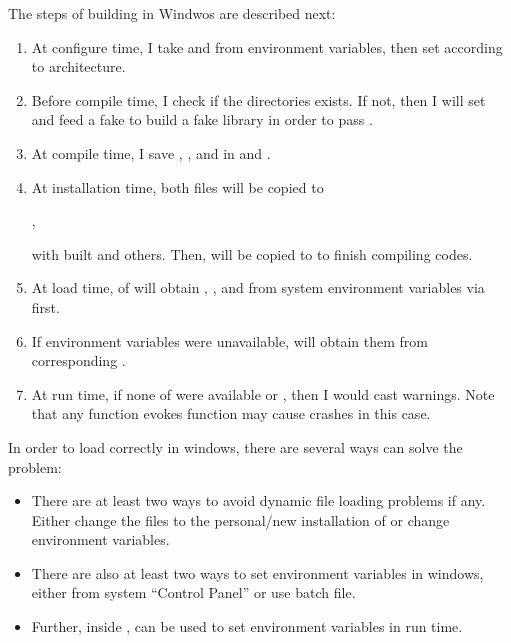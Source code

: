 The steps of building  in Windwos are described next:
\begin{enumerate}
\item
At configure time, I take  and 
from environment variables, then set  according to
architecture.
\item
Before compile time, I check if the directories exists. If not, then I will
set  and feed
a fake  to build a fake library in order to pass .
\item
At compile time, I save
, , and 
in  and .
\item
At installation time, both files will be copied to
\begin{center}
,
\end{center}
with built  and others.
Then,  will be copied to
 to finish compiling  codes.
\item
At load time,  of  will
obtain , , and 
from system environment variables via  first.
\item
If environment variables were unavailable,  will
obtain them from corresponding .
\item
At run time, if none of  were available or
, then I would cast warnings.
Note that any  function evokes  function may
cause crashes in this case.
\end{enumerate}

In order to load  correctly in windows, there are several
ways can solve the problem:
\begin{itemize}
\item
There are at least two ways to avoid dynamic file loading problems
if any. Either change the  files to the personal/new
installation of  or change environment variables.
\item
There are also at least two ways to set environment variables in windows,
either from system ``Control Panel'' or use batch file.
\item
Further, inside ,  can be used to
set environment variables in run time.
\end{itemize}
